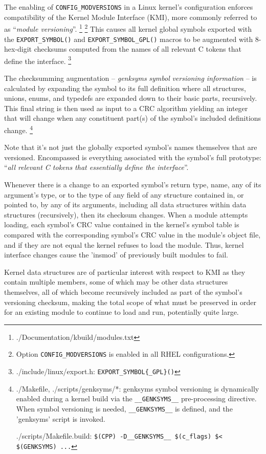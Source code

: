 \documentclass[10pt,oneside,english]{book}
\begin{document}
The enabling of \texttt{CONFIG\_MODVERSIONS} in a Linux kernel's configuration
enforces compatibility of the Kernel Module Interface (KMI), more
commonly referred to as ``\emph{module versioning}''. \footnote{./Documentation/kbuild/modules.txt}
\footnote{Option \texttt{CONFIG\_MODVERSIONS} is enabled in all RHEL configurations.}
This causes all kernel global symbols exported with the \texttt{EXPORT\_SYMBOL()}
and \texttt{EXPORT\_SYMBOL\_GPL()} macros to be augmented with 8-hex-digit
checksums computed from the names of all relevant C tokens that define
the interface. \footnote{./include/linux/export.h: \texttt{EXPORT\_SYMBOL\{\_GPL\}()}}

The checksumming augmentation -- \emph{genksyms} \emph{symbol} \emph{versioning
information} -- is calculated by expanding the symbol to its full
definition where all structures, unions, enums, and typedefs are expanded
down to their basic parts, recursively. This final string is then
used as input to a CRC algorithm yielding an integer that will change
when any constituent part(s) of the symbol's included definitions
change. \footnote{./Makefile, ./scripts/genksyms/{*}: genksyms symbol versioning is
dynamically enabled during a kernel build via the \texttt{\_\_GENKSYMS\_\_}
pre-processing directive. When symbol versioning is needed, \texttt{\_\_GENKSYMS\_\_}
is defined, and the 'genksyms' script is invoked.

./scripts/Makefile.build: \texttt{\$(CPP) -D\_\_GENKSYMS\_\_ \$(c\_flags)
\$< \$(GENKSYMS) ...}}

Note that it's not just the globally exported symbol's names themselves
that are versioned. Encompassed is everything associated with the
symbol's full prototype: ``\emph{all relevant C tokens that essentially
define the interface}''.

Whenever there is a change to an exported symbol's return type, name,
any of its argument's type, or to the type of any field of any structure
contained in, or pointed to, by any of its arguments, including all
data structures within data structures (recursively), then its checksum
changes. When a module attempts loading, each symbol's CRC value contained
in the kernel's symbol table is compared with the corresponding symbol's
CRC value in the module's object file, and if they are not equal the
kernel refuses to load the module. Thus, kernel interface changes
cause the 'insmod' of previously built modules to fail.

Kernel data structures are of particular interest with respect to
KMI as they contain multiple members, some of which may be other data
structures themselves, all of which become recursively included as
part of the symbol's versioning checksum, making the total scope of
what must be preserved in order for an existing module to continue
to load and run, potentially quite large.
\end{document}
